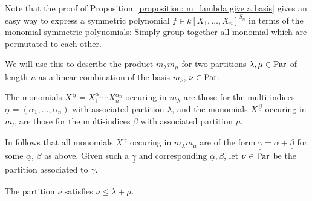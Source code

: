 \begin{fluff}
  Note that the proof of Proposition~\ref{proposition: m_lambda give a basis} gives an easy way to express a symmetric polynomial $f \in k[X_1, \dotsc, X_n]^{S_n}$ in terms of the monomial symmetric polynomials:
  Simply group together all monomial which are permutated to each other.
  
  We will use this to describe the product $m_\lambda m_\mu$ for two partitions $\lambda, \mu \in \operatorname{Par}$ of length $n$ as a linear combination of the basis $m_\nu$, $\nu \in \operatorname{Par}$:
  
  The monomials $X^{\,\underline{\alpha}} = X_1^{\alpha_1} \dotsm X_n^{\alpha_n}$ occuring in $m_\lambda$ are those for the multi-indices $\underline{\alpha} = (\alpha_1, \dotsc, \alpha_n)$ with associated partition $\lambda$, and the monomials $X^{\,\underline{\beta}}$ occuring in $m_\mu$ are those for the multi-indices $\underline{\beta}$ with associated partition $\mu$.
  
  In follows that all monomials $X^{\,\underline{\gamma}}$ occuring in $m_\lambda m_\mu$ are of the form $\underline{\gamma} = \underline{\alpha} + \underline{\beta}$ for some $\underline{\alpha}$, $\underline{\beta}$ as above.
  Given such a $\underline{\gamma}$ and corresponding $\underline{\alpha}, \underline{\beta}$, let $\nu \in \operatorname{Par}$ be the partition associated to $\underline{\gamma}$.
  
  \begin{claim}
    The partition $\nu$ satisfies $\nu \leq \lambda + \mu$.
  \end{claim}
  

\end{fluff}
